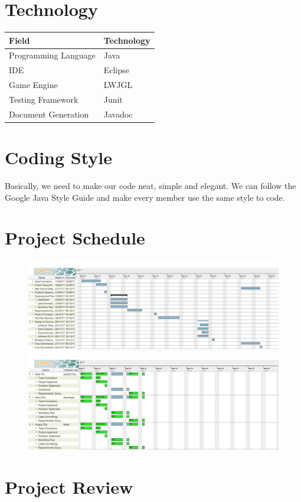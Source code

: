 \documentclass[12pt]{article}
\begin{document}
\section{Technology}
\begin{tabular}{ | m{12em} | m{6cm} | } 
\hline
Field & Technology \\
\hline
Programming Language & Java \\ 
\hline
IDE & Eclipse \\ 
\hline
Game Engine & LWJGL \\ 
\hline
Testing Framework & Junit \\
\hline
Document Generation & Javadoc \\
\hline
\end{tabular}

\section{Coding Style}
Basically, we need to make our code neat, simple and elegant. We can follow the Google Java Style Guide and make every member use the same style to code.

\section{Project Schedule}
\begin{figure}
\centering
\includegraphics[width=16cm]{img/gantt1.png}
\includegraphics[width=16cm]{img/gantt2.png}
\end{figure}
\newpage

\section{Project Review}
\end{document}
